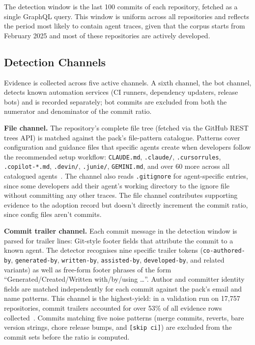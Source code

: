 The detection window is the last 100 commits of each repository, fetched as a single GraphQL query. This window is uniform across all repositories and reflects the period most likely to contain agent traces, given that the corpus starts from February 2025 and most of these repositories are actively developed.

\subsection{Detection Channels}

Evidence is collected across five active channels. A sixth channel, the bot channel, detects known automation services (CI runners, dependency updaters, release bots) and is recorded separately; bot commits are excluded from both the numerator and denominator of the commit ratio.

\textbf{File channel.} The repository's complete file tree (fetched via the GitHub REST trees API) is matched against the pack's file-pattern catalogue. Patterns cover configuration and guidance files that specific agents create when developers follow the recommended setup workflow: \texttt{CLAUDE.md}, \texttt{.claude/}, \texttt{.cursorrules}, \texttt{.copilot-*.md}, \texttt{.devin/}, \texttt{.junie/}, \texttt{GEMINI.md}, and over 60 more across all catalogued agents~\cite{galsterConfig2026, chatlatanagulchai2025}. The channel also reads \texttt{.gitignore} for agent-specific entries, since some developers add their agent's working directory to the ignore file without committing any other traces. The file channel contributes supporting evidence to the adoption record but doesn't directly increment the commit ratio, since config files aren't commits.

\textbf{Commit trailer channel.} Each commit message in the detection window is parsed for trailer lines: Git-style footer fields that attribute the commit to a known agent. The detector recognises nine specific trailer tokens (\texttt{co-authored-by}, \texttt{generated-by}, \texttt{written-by}, \texttt{assisted-by}, \texttt{developed-by}, and related variants) as well as free-form footer phrases of the form ``Generated/Created/Written with/by/using \ldots''. Author and committer identity fields are matched independently for each commit against the pack's email and name patterns. This channel is the highest-yield: in a validation run on 17,757 repositories, commit trailers accounted for over 53\% of all evidence rows collected~\cite{robbesHeuristics2026}. Commits matching five noise patterns (merge commits, reverts, bare version strings, chore release bumps, and \texttt{[skip ci]}) are excluded from the commit sets before the ratio is computed.

